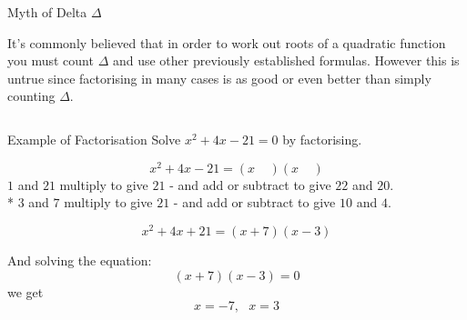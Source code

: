 \documentclass[final]{beamer}
\newlength{\onecolwid}
\newlength{\twocolwid}
\begin{document}
\begin{frame}[t]
\begin{columns}[t]
\begin{column}{\twocolwid}
\begin{columns}[t,totalwidth=\twocolwid]
\begin{column}{\onecolwid}
    \end{column} %
  
  \end{columns} %
  
    
    \begin{alertblock}{Myth of Delta $\Delta$}
  
  It's commonly believed that in order to work out roots of a quadratic function you must count $\Delta$ and use other previously established formulas. However this is untrue since factorising in many cases is as good or even better than simply counting $\Delta$.
  
  \end{alertblock} 
  
  
  \begin{columns}[t,totalwidth=\twocolwid] %
  
  \begin{column}{\onecolwid} %
  
  
  \begin{block}{Example of Factorisation}
  Solve $x^2+4x-21=0$ by factorising.
  
  $$x^2+4x-21=(x\ \ \ \ \ )(x\ \ \ \ \ )$$
  $1$ and $21$ multiply to give $21$ - and add or subtract to give $22$ and $20$.\\*
  $3$ and $7$ multiply to give $21$ - and add or subtract to give $10$ and \textbf{$4$}.
  
  $$x^2+4x+21 = (x+7)(x-3)$$
  
  And solving the equation:
  $$(x+7)(x-3)=0$$
  we get
  $$x=-7,\ \ \ x=3$$
  
  \end{block}
  
  

\end{column}
\end{columns}
\end{column}
\end{columns}
\end{frame}
\end{document}
